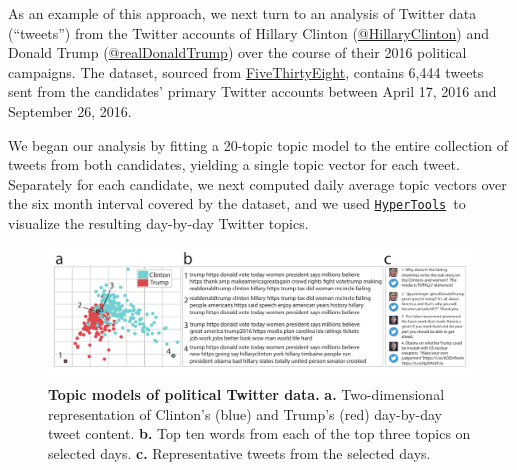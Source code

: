 \documentclass[12pt,letterpaper]{article}
\newcommand{\hypertools}{\href{https://github.com/ContextLab/hypertools}{\texttt{HyperTools}}}
\newcounter{example}
\begin{document}
As an example of this approach, we next turn to an analysis of Twitter data (``tweets'') from the Twitter accounts of Hillary Clinton (\href{https://twitter.com/HillaryClinton}{@HillaryClinton}) and Donald Trump (\href{https://twitter.com/realDonaldTrump}{@realDonaldTrump}) over the course of their 2016 political campaigns.  The dataset, sourced from \href{https://github.com/fivethirtyeight}{FiveThirtyEight}, contains 6,444 tweets sent from the candidates' primary Twitter accounts between April 17, 2016 and September 26, 2016.

We began our analysis by fitting a 20-topic topic model to the entire collection of tweets from both candidates, yielding a single topic vector for each tweet.  Separately for each candidate, we next computed daily average topic vectors over the six month interval covered by the dataset, and we used \hypertools~to visualize the resulting day-by-day Twitter topics.
    
\begin{figure}[tbp]
\centering
\includegraphics[width=1\textwidth]{tweets}
\caption{\textbf{Topic models of political Twitter data.} \textbf{a.} Two-dimensional representation of Clinton's (blue) and Trump's (red) day-by-day tweet content. \textbf{b.} Top ten words from each of the top three topics on selected days. \textbf{c.} Representative tweets from the selected days.}
\label{fig:tweets}
\end{figure}
\end{document}
